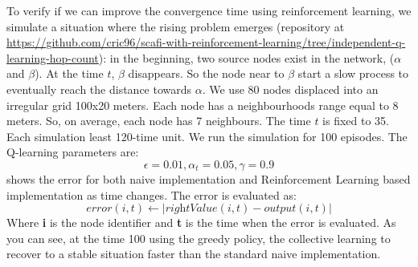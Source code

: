 \documentclass[
  twocolumn,
]{ceurart}
\begin{document}
To verify if we can improve the convergence time using reinforcement learning,
 we simulate a situation where the rising problem emerges (repository at \url{https://github.com/cric96/scafi-with-reinforcement-learning/tree/independent-q-learning-hop-count}):
 in the beginning, two source nodes exist in the network, ($\alpha$ and $\beta$).
 At the time $t$, $\beta$ disappears. So the node near to $\beta$ start a slow process
 to eventually reach the distance towards $\alpha$.
%
We use 80 nodes displaced into an irregular grid 100x20 meters. 
 Each node has a neighbourhoods range equal to 8 meters. 
 So, on average, each node has 7 neighbours.
 The time $t$ is fixed to 35.
 Each simulation least 120-time unit.
% 
We run the simulation for 100 episodes.
 The Q-learning parameters are:
$$
\epsilon = 0.01, 
\alpha_t = 0.05,
\gamma = 0.9
$$
 shows the error for both naive implementation and Reinforcement Learning based implementation as time changes.
The error is evaluated as:
$$
error(i, t) \leftarrow  | \textit{rightValue}(i,t) - \textit{output}(i,t) |
$$
Where \textbf{i} is the node identifier and \textbf{t} is the time when the error is evaluated.
%
As you can see, at the time 100 using the greedy policy, the collective learning to recover to a stable situation
 faster than the standard naive implementation.
\end{document}
